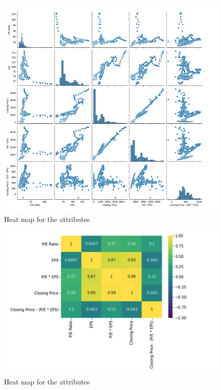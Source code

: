 \documentclass{article}
\begin{document}
\begin{figure}[h!]
	\begin{center}
		\includegraphics[scale=0.45]{p4.png}\caption{Heat map for the attributes}
	\end{center}
\end{figure}

\begin{figure}[H]
	\begin{center}
		\includegraphics[scale=0.45]{p3.png}\caption{Heat map for the attributes}
	\end{center}
\end{figure}
\end{document}
